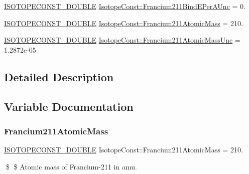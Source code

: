 \begin{DoxyCompactItemize}
\mbox{\hyperlink{group___isotope_const-_macros_ga8f45a7272ce02c0b4c65c44636ed719a}{I\+S\+O\+T\+O\+P\+E\+C\+O\+N\+S\+T\+\_\+\+D\+O\+U\+B\+LE}} \mbox{\hyperlink{group___isotope_const-_francium-_fr211_gac2a04a2618af4dd5fd3d94a7051f23dc}{Isotope\+Const\+::\+Francium211\+Bind\+E\+Per\+A\+Unc}} = 0.
\item 
\mbox{\hyperlink{group___isotope_const-_macros_ga8f45a7272ce02c0b4c65c44636ed719a}{I\+S\+O\+T\+O\+P\+E\+C\+O\+N\+S\+T\+\_\+\+D\+O\+U\+B\+LE}} \mbox{\hyperlink{group___isotope_const-_francium-_fr211_gae0674fa7de02360149b7803306f6bd36}{Isotope\+Const\+::\+Francium211\+Atomic\+Mass}} = 210.
\item 
\mbox{\hyperlink{group___isotope_const-_macros_ga8f45a7272ce02c0b4c65c44636ed719a}{I\+S\+O\+T\+O\+P\+E\+C\+O\+N\+S\+T\+\_\+\+D\+O\+U\+B\+LE}} \mbox{\hyperlink{group___isotope_const-_francium-_fr211_gaa1022f10738e602b653866e088c2d22f}{Isotope\+Const\+::\+Francium211\+Atomic\+Mass\+Unc}} = 1.\+2872e-\/05
\end{DoxyCompactItemize}


\subsection{Detailed Description}


\subsection{Variable Documentation}
\mbox{\label{group___isotope_const-_francium-_fr211_gae0674fa7de02360149b7803306f6bd36}} 
\subsubsection{\texorpdfstring{Francium211\+Atomic\+Mass}{Francium211AtomicMass}}
{\footnotesize\ttfamily \mbox{\hyperlink{group___isotope_const-_macros_ga8f45a7272ce02c0b4c65c44636ed719a}{I\+S\+O\+T\+O\+P\+E\+C\+O\+N\+S\+T\+\_\+\+D\+O\+U\+B\+LE}} Isotope\+Const\+::\+Francium211\+Atomic\+Mass = 210.}

\$ \$ Atomic mass of Francium-\/211 in amu. \mbox{\label{group___isotope_const-_francium-_fr211_gaa1022f10738e602b653866e088c2d22f}} 
